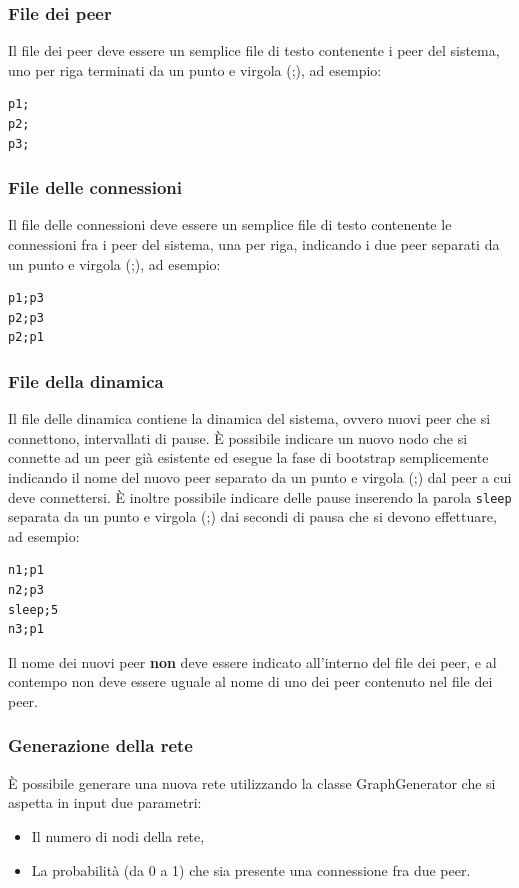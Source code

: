 \documentclass[a4paper,11pt]{article}
\begin{document}
\subsubsection{File dei peer}

Il file dei peer deve essere un semplice file di testo contenente i peer del sistema, uno per riga terminati da un punto e virgola (;), ad esempio:
\begin{verbatim}
p1;
p2;
p3;
\end{verbatim}

\subsubsection{File delle connessioni}

Il file delle connessioni deve essere un semplice file di testo contenente le connessioni fra i peer del sistema, una per riga, indicando i due peer separati da un punto e virgola (;), ad esempio:
\begin{verbatim}
p1;p3
p2;p3
p2;p1
\end{verbatim}

\subsubsection{File della dinamica}

Il file delle dinamica contiene la dinamica del sistema, ovvero nuovi peer che si connettono, intervallati di pause. \`E possibile indicare un nuovo nodo che si connette ad un peer gi\`a esistente ed esegue la fase di bootstrap semplicemente indicando il nome del nuovo peer separato da un punto e virgola (;) dal peer a cui deve connettersi.
\`E inoltre possibile indicare delle pause inserendo la parola \texttt{sleep} separata da un punto e virgola (;) dai secondi di pausa che si devono effettuare, ad esempio:
\begin{verbatim}
n1;p1
n2;p3
sleep;5
n3;p1
\end{verbatim}

Il nome dei nuovi peer \textbf{non} deve essere indicato all'interno del file dei peer, e al contempo non deve essere uguale al nome di uno dei peer contenuto nel file dei peer.

\subsubsection{Generazione della rete}

\`E possibile generare una nuova rete utilizzando la classe \textsf{GraphGenerator} che si aspetta in input due parametri:
\begin{itemize}
\item Il numero di nodi della rete,
\item La probabilit\`a (da 0 a 1) che sia presente una connessione fra due peer.
\end{itemize}
\end{document}
